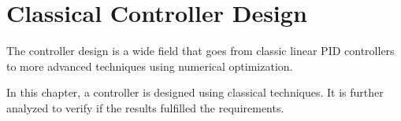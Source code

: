 \chapter{Classical Controller Design}\label{chap:controllerDesign}
The controller design is a wide field that goes from classic linear PID controllers to more advanced techniques using numerical optimization.

In this chapter, a controller is designed using classical techniques. It is further analyzed to verify if the results fulfilled the requirements.
